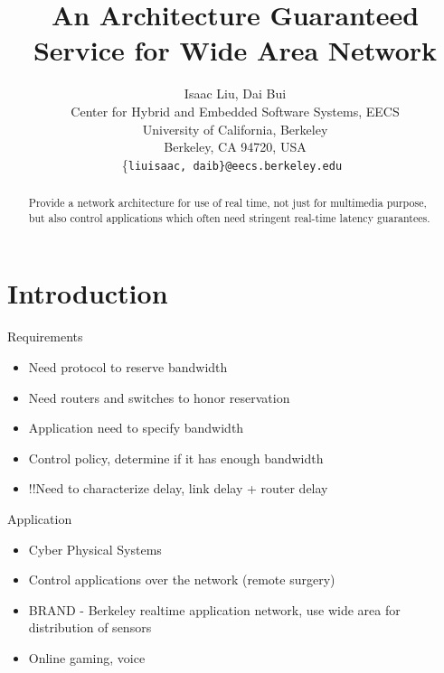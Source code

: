 \documentclass[times, 10pt,twocolumn]{article}
\begin{document}
  \title{An Architecture  Guaranteed Service for Wide Area Network}

  \author{Isaac Liu, Dai Bui \\
    Center for Hybrid and Embedded Software Systems, EECS \\
    University of California, Berkeley \\
    Berkeley, CA 94720, USA \\
    \{\tt liuisaac, daib\}@eecs.berkeley.edu
  }


\maketitle
\thispagestyle{empty}

\begin{abstract}
Provide a network architecture for use of real time, not just for multimedia purpose, but also control applications which often need stringent real-time latency guarantees.

\end{abstract}

\section{Introduction}
Requirements
\begin{itemize}
\item Need protocol to reserve bandwidth
\item Need routers and switches to honor reservation
\item Application need to specify bandwidth
\item Control policy, determine if it has enough bandwidth
\item !!Need to characterize delay, link delay + router delay
\end{itemize}

Application
\begin{itemize}
\item Cyber Physical Systems
\item Control applications over the network (remote surgery)
\item BRAND - Berkeley realtime application network, use wide area for distribution of sensors
\item Online gaming, voice
\end{itemize}
\end{document}
